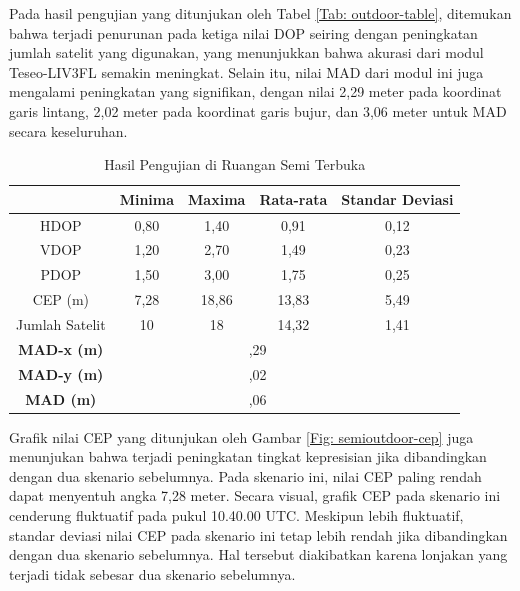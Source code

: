 Pada hasil pengujian yang ditunjukan oleh Tabel \ref{Tab: outdoor-table}, ditemukan bahwa terjadi penurunan pada ketiga nilai DOP seiring dengan peningkatan jumlah satelit yang digunakan, yang menunjukkan bahwa akurasi dari modul Teseo-LIV3FL semakin meningkat. Selain itu, nilai MAD dari modul ini juga mengalami peningkatan yang signifikan, dengan nilai 2,29 meter pada koordinat garis lintang, 2,02 meter pada koordinat garis bujur, dan 3,06 meter untuk MAD secara keseluruhan.

\begin{table}[H]
	\caption{Hasil Pengujian di Ruangan Semi Terbuka}
	\vspace{0.5em}
	\centering
	\begin{tabular}{ccccc}
		\hline
		& \textbf{Minima} & \textbf{Maxima} & \textbf{Rata-rata} & \textbf{Standar Deviasi}\\
		\hline 
		HDOP & 0,80 & 1,40 & 0,91 & 0,12\\
		VDOP & 1,20	& 2,70 & 1,49 & 0,23\\
		PDOP & 1,50	& 3,00 & 1,75 & 0,25\\
		CEP (m) & 7,28	& 18,86 & 13,83 & 5,49\\
		Jumlah Satelit & 10 & 18 & 14,32 & 1,41\\
		\hline
		\textbf{MAD-x (m)} & & \multicolumn{2}{c}{\centering 2,29} & \\
		\hline
		\textbf{MAD-y (m)} & & \multicolumn{2}{c}{\centering 2,02} & \\
		\hline
		\textbf{MAD (m)} & & \multicolumn{2}{c}{\centering 3,06} & \\
		\hline
	\end{tabular}
	\label{Tab: semioutdoor-table}
\end{table}

Grafik nilai CEP yang ditunjukan oleh Gambar \ref{Fig: semioutdoor-cep} juga menunjukan bahwa terjadi peningkatan tingkat kepresisian jika dibandingkan dengan dua skenario sebelumnya. Pada skenario ini, nilai CEP paling rendah dapat menyentuh angka 7,28 meter. Secara visual, grafik CEP pada skenario ini cenderung fluktuatif pada pukul 10.40.00 UTC. Meskipun lebih fluktuatif, standar deviasi nilai CEP pada skenario ini tetap lebih rendah jika dibandingkan dengan dua skenario sebelumnya. Hal tersebut diakibatkan karena lonjakan yang terjadi tidak sebesar dua skenario sebelumnya.

